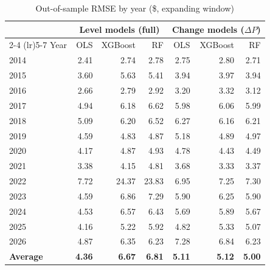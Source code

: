 \documentclass[12pt]{article}
\begin{document}
\begin{table}[H]
\centering
\caption{Out-of-sample RMSE by year (\$, expanding window)}
\label{tab:yearly_rmse}
\small
\begin{tabular}{lrrrrrr}
\toprule
 & \multicolumn{3}{c}{Level models (full)} & \multicolumn{3}{c}{Change models ($\Delta P$)} \\
\cmidrule(lr){2-4} \cmidrule(lr){5-7}
Year & OLS & XGBoost & RF & OLS & XGBoost & RF \\
\midrule
2014 & 2.41 & 2.74 & 2.78 & 2.75 & 2.80 & 2.71 \\
2015 & 3.60 & 5.63 & 5.41 & 3.94 & 3.97 & 3.94 \\
2016 & 2.66 & 2.79 & 2.92 & 3.20 & 3.32 & 3.12 \\
2017 & 4.94 & 6.18 & 6.62 & 5.98 & 6.06 & 5.99 \\
2018 & 5.09 & 6.20 & 6.52 & 6.27 & 6.16 & 6.21 \\
2019 & 4.59 & 4.83 & 4.87 & 5.18 & 4.89 & 4.97 \\
2020 & 4.17 & 4.87 & 4.93 & 4.78 & 4.43 & 4.49 \\
2021 & 3.38 & 4.15 & 4.81 & 3.68 & 3.33 & 3.37 \\
2022 & 7.72 & 24.37 & 23.83 & 6.95 & 7.25 & 7.30 \\
2023 & 4.59 & 6.86 & 7.29 & 5.90 & 6.25 & 5.90 \\
2024 & 4.53 & 6.57 & 6.43 & 5.69 & 5.89 & 5.67 \\
2025 & 4.16 & 5.22 & 5.92 & 4.82 & 5.33 & 5.07 \\
2026 & 4.87 & 6.35 & 6.23 & 7.28 & 6.84 & 6.23 \\
\midrule
\textbf{Average} & \textbf{4.36} & \textbf{6.67} & \textbf{6.81} & \textbf{5.11} & \textbf{5.12} & \textbf{5.00} \\
\bottomrule
\end{tabular}
\end{table}
\end{document}
